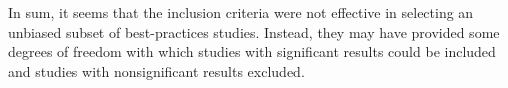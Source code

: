 \documentclass[man]{apa6}
\begin{document}


In sum, it seems that the inclusion criteria were not effective in selecting an unbiased subset of best-practices studies. Instead, they may have provided some degrees of freedom with which studies with significant results could be included and studies with nonsignificant results excluded. %

\end{document}
